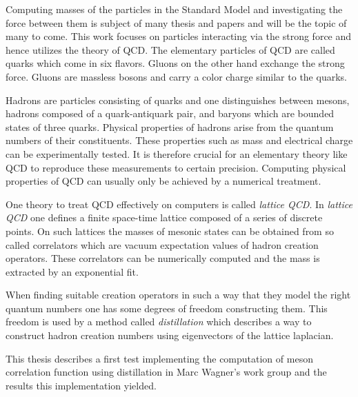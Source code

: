Computing masses of the particles in the Standard Model and investigating the force between them is subject of many thesis and papers and will be the topic of many to come. This work focuses on particles interacting via the strong force and hence utilizes the theory of QCD. The elementary particles of QCD are called quarks which come in six flavors. Gluons on the other hand exchange the strong force. Gluons are massless bosons and carry a color charge similar to the quarks.

Hadrons are particles consisting of quarks and one distinguishes between mesons, hadrons composed of a quark-antiquark pair, and baryons which are bounded states of three quarks. Physical properties of hadrons arise from the quantum numbers of their constituents. These properties such as mass and electrical charge can be experimentally tested. It is therefore crucial for an elementary theory like QCD to reproduce these measurements to certain precision. Computing physical properties of QCD can usually only be achieved by a numerical treatment.

One theory to treat QCD effectively on computers is called \textit{lattice QCD}. In \textit{lattice QCD} one defines a finite space-time lattice composed of a series of discrete points. On such lattices the masses of mesonic states can be obtained from so called correlators which are vacuum expectation values of hadron creation operators. These correlators can be numerically computed and the mass is extracted by an exponential fit.

When finding suitable creation operators in such a way that they model the right quantum numbers one has some degrees of freedom constructing them. This freedom is used by a method called \textit{distillation} which describes a way to construct hadron creation numbers using eigenvectors of the lattice laplacian.

This thesis describes a first test implementing the computation of meson correlation function using distillation in Marc Wagner's work group and the results this implementation yielded.